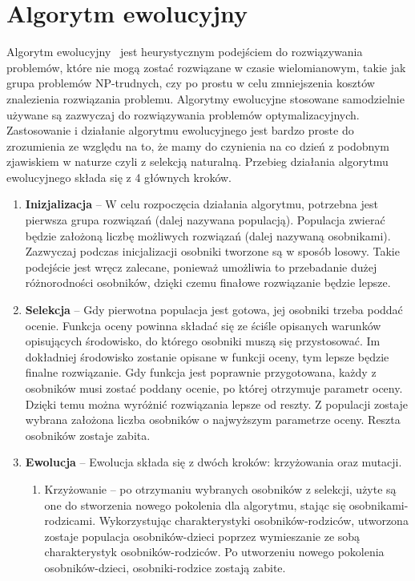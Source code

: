 \section{Algorytm ewolucyjny}
Algorytm ewolucyjny~\cite{evolution_algorithm} jest heurystycznym podejściem do rozwiązywania problemów, które nie mogą zostać rozwiązane w czasie wielomianowym, takie jak grupa problemów NP-trudnych, czy po prostu w celu zmniejszenia kosztów znalezienia rozwiązania problemu. Algorytmy ewolucyjne stosowane samodzielnie używane są zazwyczaj do rozwiązywania problemów optymalizacyjnych. Zastosowanie i działanie algorytmu ewolucyjnego jest bardzo proste do zrozumienia ze względu na to, że mamy do czynienia na co dzień z podobnym zjawiskiem w naturze czyli z selekcją naturalną. Przebieg działania algorytmu ewolucyjnego składa się z 4 głównych kroków.
	\begin{enumerate}
	\item \textbf{Inizjalizacja} -- W celu rozpoczęcia działania algorytmu, potrzebna jest pierwsza grupa rozwiązań (dalej nazywana populacją). Populacja zwierać będzie założoną liczbę możliwych rozwiązań (dalej nazywaną osobnikami). Zazwyczaj podczas inicjalizacji osobniki tworzone są w sposób losowy. Takie podejście jest wręcz zalecane, ponieważ umożliwia to przebadanie dużej różnorodności osobników, dzięki czemu finałowe rozwiązanie będzie lepsze.
	\item \textbf{Selekcja} -- Gdy pierwotna populacja jest gotowa, jej osobniki trzeba poddać ocenie. Funkcja oceny powinna składać się ze ściśle opisanych warunków opisujących środowisko, do którego osobniki muszą się przystosować. Im dokładniej środowisko zostanie opisane w funkcji oceny, tym lepsze będzie finalne rozwiązanie. Gdy funkcja jest poprawnie przygotowana, każdy z osobników musi zostać poddany ocenie, po której otrzymuje parametr oceny. Dzięki temu można wyróżnić rozwiązania lepsze od reszty. Z populacji zostaje wybrana założona liczba osobników o najwyższym parametrze oceny. Reszta osobników zostaje zabita.
	\item \textbf{Ewolucja} -- Ewolucja składa się z dwóch kroków: krzyżowania oraz mutacji. 
	\begin{enumerate}
		\item Krzyżowanie -- po otrzymaniu wybranych osobników z selekcji, użyte są one do stworzenia nowego pokolenia dla algorytmu, stając się osobnikami-rodzicami. Wykorzystując charakterystyki osobników-rodziców, utworzona zostaje populacja osobników-dzieci poprzez wymieszanie ze sobą charakterystyk osobników-rodziców. Po utworzeniu nowego pokolenia osobników-dzieci, osobniki-rodzice zostają zabite.

\end{enumerate}
\end{enumerate}
